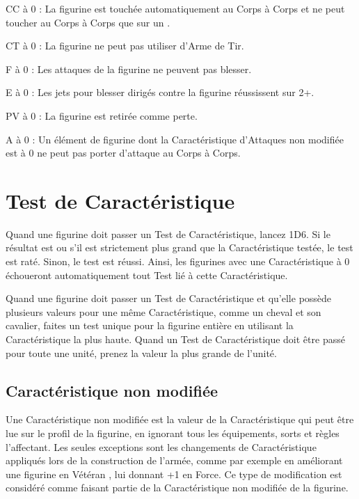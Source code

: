 \noindent CC à 0 : La figurine est touchée automatiquement au Corps à Corps et ne peut toucher au Corps à Corps que sur un .

\noindent CT à 0 : La figurine ne peut pas utiliser d'Arme de Tir.

\noindent F à 0 : Les attaques de la figurine ne peuvent pas blesser.

\noindent E à 0 : Les jets pour blesser dirigés contre la figurine réussissent sur 2+.

\noindent PV à 0 : La figurine est retirée comme perte.

\noindent A à 0 : Un élément de figurine dont la Caractéristique d'Attaques non modifiée est à 0 ne peut pas porter d'attaque au Corps à Corps.

\newpage
\section{Test de Caractéristique}

Quand une figurine doit passer un Test de Caractéristique, lancez 1D6. Si le résultat est  ou s'il est strictement plus grand que la Caractéristique testée, le test est raté. Sinon, le test est réussi. Ainsi, les figurines avec une Caractéristique à 0 échoueront automatiquement tout Test lié à cette Caractéristique.

Quand une figurine doit passer un Test de Caractéristique et qu'elle possède plusieurs valeurs pour une même Caractéristique, comme un cheval et son cavalier, faites un test unique pour la figurine entière en utilisant la Caractéristique la plus haute. Quand un Test de Caractéristique doit être passé pour toute une unité, prenez la valeur la plus grande de l'unité.

\subsection{Caractéristique non modifiée}

Une Caractéristique non modifiée est la valeur de la Caractéristique qui peut être lue sur le profil de la figurine, en ignorant tous les équipements, sorts et règles l'affectant. Les seules exceptions sont les changements de Caractéristique appliqués lors de la construction de l'armée, comme par exemple en améliorant une figurine en \og Vétéran \fg{}, lui donnant +1 en Force. Ce type de modification est considéré comme faisant partie de la Caractéristique non modifiée de la figurine.

